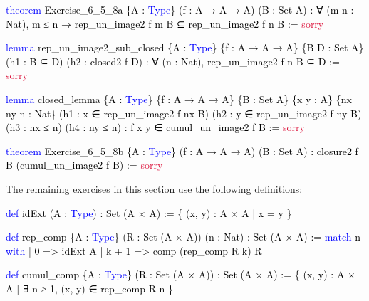 \documentclass[
  letterpaper,
  DIV=11,
  numbers=noendperiod]{scrreprt}
\newenvironment{Shaded}{\begin{snugshade}}{\end{snugshade}}
\newcommand{\ConstantTok}[1]{\textcolor[rgb]{0.56,0.35,0.01}{#1}}
\newcommand{\KeywordTok}[1]{\textcolor[rgb]{0.00,0.23,0.31}{#1}}
\newcommand{\NormalTok}[1]{\textcolor[rgb]{0.00,0.23,0.31}{#1}}
\renewcommand{\NormalTok}[1]{\textcolor[HTML]{000000}{#1}}
\renewcommand{\KeywordTok}[1]{\textcolor[HTML]{0000FF}{#1}}
\renewcommand{\ConstantTok}[1]{\textcolor[HTML]{DC143C}{#1}}
\newenvironment{mdsk}
	{\medskip}
	{}
\theoremstyle{remark}
\begin{document}
\begin{Shaded}
\begin{Highlighting}[]
\KeywordTok{theorem}\NormalTok{ Exercise\_6\_5\_8a \{A : }\KeywordTok{Type}\NormalTok{\} (f : A → A → A) (B : Set A) :}
\NormalTok{    ∀ (m n : Nat), m ≤ n →}
\NormalTok{    rep\_un\_image2 f m B ⊆ rep\_un\_image2 f n B := }\ConstantTok{sorry}

\KeywordTok{lemma}\NormalTok{ rep\_un\_image2\_sub\_closed \{A : }\KeywordTok{Type}\NormalTok{\} \{f : A → A → A\} \{B D : Set A\}}
\NormalTok{    (h1 : B ⊆ D) (h2 : closed2 f D) :}
\NormalTok{    ∀ (n : Nat), rep\_un\_image2 f n B ⊆ D := }\ConstantTok{sorry}

\KeywordTok{lemma}\NormalTok{ closed\_lemma}
\NormalTok{    \{A : }\KeywordTok{Type}\NormalTok{\} \{f : A → A → A\} \{B : Set A\} \{x y : A\} \{nx ny n : Nat\}}
\NormalTok{    (h1 : x ∈ rep\_un\_image2 f nx B) (h2 : y ∈ rep\_un\_image2 f ny B)}
\NormalTok{    (h3 : nx ≤ n) (h4 : ny ≤ n) :}
\NormalTok{    f x y ∈ cumul\_un\_image2 f B := }\ConstantTok{sorry}

\KeywordTok{theorem}\NormalTok{ Exercise\_6\_5\_8b \{A : }\KeywordTok{Type}\NormalTok{\} (f : A → A → A) (B : Set A) :}
\NormalTok{    closure2 f B (cumul\_un\_image2 f B) := }\ConstantTok{sorry}
\end{Highlighting}
\end{Shaded}

\begin{mdsk}

\end{mdsk}

The remaining exercises in this section use the following definitions:

\begin{Shaded}
\begin{Highlighting}[]
\KeywordTok{def}\NormalTok{ idExt (A : }\KeywordTok{Type}\NormalTok{) : Set (A × A) := \{ (x, y) : A × A | x = y \}}

\KeywordTok{def}\NormalTok{ rep\_comp \{A : }\KeywordTok{Type}\NormalTok{\} (R : Set (A × A)) (n : Nat) : Set (A × A) :=}
  \KeywordTok{match}\NormalTok{ n }\KeywordTok{with}
\NormalTok{    | 0 =\textgreater{} idExt A}
\NormalTok{    | k + 1 =\textgreater{} comp (rep\_comp R k) R}

\KeywordTok{def}\NormalTok{ cumul\_comp \{A : }\KeywordTok{Type}\NormalTok{\} (R : Set (A × A)) : Set (A × A) :=}
\NormalTok{  \{ (x, y) : A × A | ∃ n ≥ 1, (x, y) ∈ rep\_comp R n \}}
\end{Highlighting}
\end{Shaded}
\end{document}
